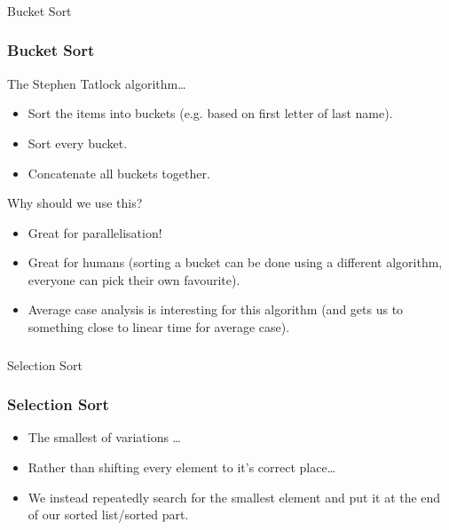 \begin{frame}[fragile]\frametitle{}
\begin{center}
{\Large Bucket Sort}
\end{center}

\end{frame}

\begin{frame}
	\frametitle{Bucket Sort}
The Stephen Tatlock algorithm\dots 

			\begin{itemize}
				\item Sort the items into buckets (e.g. based on first letter of last name).
					
				\item Sort every bucket.
					
				\item Concatenate all buckets together.
			\end{itemize}
		

			Why should we use this?
		
			\begin{itemize}
				\item Great for parallelisation!
				\item Great for humans (sorting a bucket can be done using a different algorithm, everyone can pick their own
					favourite).
				\item Average case analysis is interesting for this algorithm (and gets us to something close to linear time for
					average case).
			\end{itemize}
\end{frame}

\begin{frame}[fragile]\frametitle{}
\begin{center}
{\Large Selection Sort}
\end{center}

\end{frame}

\begin{frame}
	\frametitle{Selection Sort}
			\begin{itemize}
				\item The smallest of variations \ldots
				\item Rather than shifting every element to it's correct place\dots
				\item We instead repeatedly search for the smallest element and put it at the end of our sorted list/sorted part.
			\end{itemize}
				
	\begin{center}
	
	\end{center}
\end{frame}

